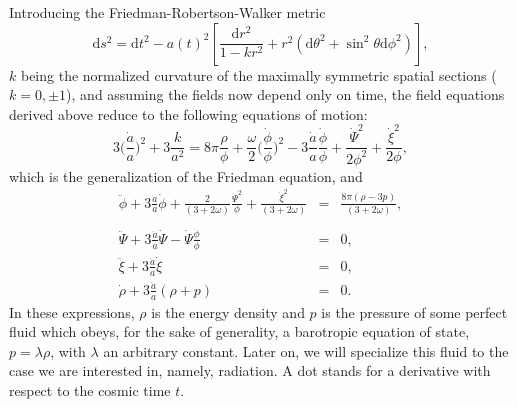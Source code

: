 \documentclass[a4paper,aps,twocolumn,prd,showpacs,nofootinbib]{revtex4}
\newcommand{\dd}{\mathrm{d}}
\begin{document}
Introducing the Friedman-Robertson-Walker metric
\begin{equation}
\dd s^2 = \dd t^2 - a(t)^2\left[\frac{\dd r^2}{1 - kr^2} +
r^2\left(\dd\theta^2 + \sin^2\theta \dd\phi^2\right)\right],
\end{equation}
$k$ being the normalized curvature of the maximally symmetric spatial
sections ($k = 0, \pm 1$), and assuming the fields now depend only on
time, the field equations derived above reduce to the following
equations of motion:
\begin{equation}
\label{em1} 3\biggr(\frac{\dot a}{a}\biggl)^2 + 3\frac{k}{a^2}
= 8\pi\frac{\rho}{\phi} +
\frac{\omega}{2}\biggr(\frac{\dot\phi}{\phi}\biggl)^2 - 3\frac{\dot
a}{a} \frac{\dot\phi}{\phi} + \frac{\dot\Psi^2}{2\phi^{2}} +
\frac{\dot\xi^2}{2\phi},
\end{equation}
which is the generalization of the Friedman equation, and
\begin{eqnarray}
\label{em2}
\ddot\phi + 3\frac{\dot a}{a}\dot\phi + \frac{2}{(3 +
2\omega)}\frac{\dot\Psi^2}{\phi} + \frac{\dot\xi^2}{(3 + 2\omega)} &=&
\frac{8\pi(\rho - 3p)}{(3 + 2\omega)},\nonumber \\ \\ \label{em3}
\ddot\Psi + 3 \frac{\dot a}{a}\dot\Psi - \dot\Psi\frac{\dot\phi}{\phi}
&=& 0,\\
\label{em4}
\ddot\xi + 3\frac{\dot a}{a}\dot\xi &=& 0,\\
\label{em5} \dot\rho + 3\frac{\dot a}{a}(\rho + p) &=& 0.
\end{eqnarray}
In these expressions, $\rho$ is the energy density and $p$ is the
pressure of some perfect fluid which obeys, for the sake of
generality, a barotropic equation of state, $p = \lambda\rho$, with
$\lambda$ an arbitrary constant. Later on, we will specialize this
fluid to the case we are interested in, namely, radiation.  A dot
stands for a derivative with respect to the cosmic time $t$.
\end{document}
